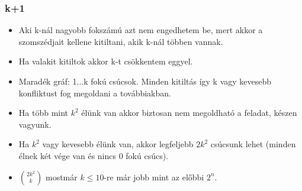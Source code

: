 \begin{frame}
\frametitle{k+1}
\begin{itemize}
\item Aki k-nál nagyobb fokszámú azt nem engedhetem be, mert akkor a szomszédjait kellene kitiltani, akik k-nál többen vannak.
\item Ha valakit kitiltok akkor k-t csökkentem eggyel.
\item Maradék gráf: 1...k fokú csúcsok. Minden kitiltás így k vagy kevesebb konfliktust fog megoldani a továbbiakban.
\item Ha több mint $k^2$ élünk van akkor biztosan nem megoldható a feladat, készen vagyunk.
\item Ha $k^2$ vagy kevesebb élünk van, akkor legfeljebb $2k^2$ csúcsunk lehet (minden élnek két vége van és nincs 0 fokú csúcs).
\item ${2k^2 \choose k}$ mostmár $k\leq{}10$-re már jobb mint az előbbi $2^n$.
\end{itemize}
\end{frame}
